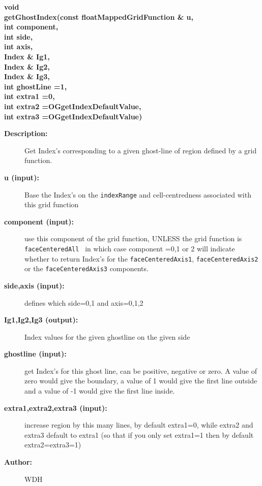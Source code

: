  
\begin{flushleft} \textbf{%
void  \\ 
\settowidth{\OGgetIndexIncludeArgIndent}{getGhostIndex(}%
getGhostIndex(const floatMappedGridFunction \& u, \\ 
\hspace{\OGgetIndexIncludeArgIndent}int component,\\ 
\hspace{\OGgetIndexIncludeArgIndent}int side, \\ 
\hspace{\OGgetIndexIncludeArgIndent}int axis, \\ 
\hspace{\OGgetIndexIncludeArgIndent}Index \& Ig1, \\ 
\hspace{\OGgetIndexIncludeArgIndent}Index \& Ig2, \\ 
\hspace{\OGgetIndexIncludeArgIndent}Index \& Ig3, \\ 
\hspace{\OGgetIndexIncludeArgIndent}int ghostLine =1,\\ 
\hspace{\OGgetIndexIncludeArgIndent}int extra1 =0,\\ 
\hspace{\OGgetIndexIncludeArgIndent}int extra2 =OGgetIndexDefaultValue,\\ 
\hspace{\OGgetIndexIncludeArgIndent}int extra3   =OGgetIndexDefaultValue)
}\end{flushleft}
\begin{description}
\item[{\bf Description:}] 
    Get Index's corresponding to a given ghost-line of region defined by a grid function.
\item[{\bf u (input):}]  Base the Index's on the {\tt indexRange} and cell-centredness associated   
     with this grid function
\item[{\bf component (input):}]  use this component of the grid function, UNLESS the grid function 
    is {\tt faceCenteredAll } in which case component =0,1 or 2 will indicate whether to return
   Index's for the {\tt faceCenteredAxis1}, {\tt faceCenteredAxis2} or the {\tt faceCenteredAxis3} components.
\item[{\bf side,axis (input):}]  defines which side=0,1 and axis=0,1,2
\item[{\bf Ig1,Ig2,Ig3 (output):}]  Index values for the given ghostline on the given side
\item[{\bf ghostline (input):}]  get Index's for this ghost line, can be positive, negative or zero.
        A value of zero would give the boundary, a value of 1 would give the first
        line outside and a value of -1 would give the first line inside.
\item[{\bf extra1,extra2,extra3 (input):}]  increase region by this many lines, by default extra1=0, while 
                         extra2 and extra3 default to extra1 (so that if you only set extra1=1
                         then by default extra2=extra3=1)
\item[{\bf Author:}]  WDH
\end{description}
